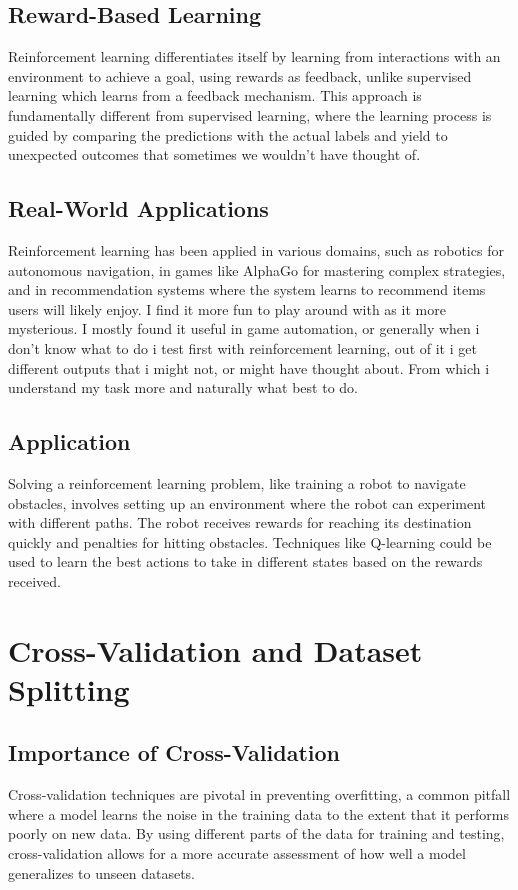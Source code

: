 \documentclass[11pt, a4paper]{article}
\begin{document}
\subsection{Reward-Based Learning}
Reinforcement learning differentiates itself by learning from interactions with an environment to achieve a goal, using rewards as feedback, unlike supervised learning which learns from a feedback mechanism. This approach is fundamentally different from supervised learning, where the learning process is guided by comparing the predictions with the actual labels and yield to unexpected outcomes that sometimes we wouldn't have thought of.

\subsection{Real-World Applications}
Reinforcement learning has been applied in various domains, such as robotics for autonomous navigation, in games like AlphaGo for mastering complex strategies, and in recommendation systems where the system learns to recommend items users will likely enjoy. I find it more fun to play around with as it more mysterious. I mostly found it useful in game automation, or generally when i don't know what to do i test first with reinforcement learning, out of it i get different outputs that i might not, or might have thought about. From which i understand my task more and naturally what best to do.

\subsection{Application}
Solving a reinforcement learning problem, like training a robot to navigate obstacles, involves setting up an environment where the robot can experiment with different paths. The robot receives rewards for reaching its destination quickly and penalties for hitting obstacles. Techniques like Q-learning could be used to learn the best actions to take in different states based on the rewards received.

\section{Cross-Validation and Dataset Splitting}

\subsection{Importance of Cross-Validation}
Cross-validation techniques are pivotal in preventing overfitting, a common pitfall where a model learns the noise in the training data to the extent that it performs poorly on new data. By using different parts of the data for training and testing, cross-validation allows for a more accurate assessment of how well a model generalizes to unseen datasets.
\end{document}
